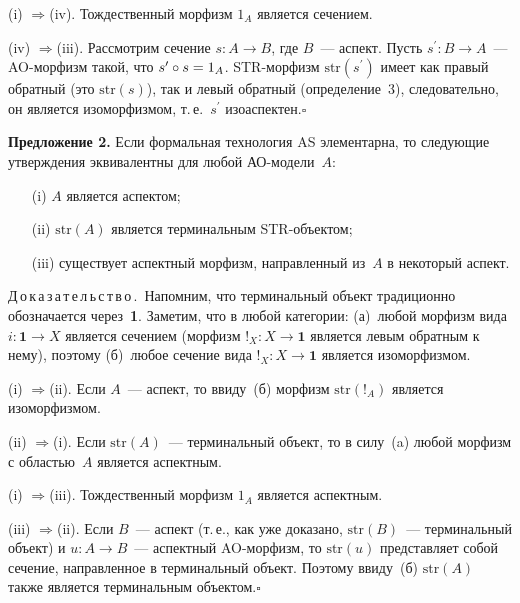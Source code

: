 \begin{multicols}{2}
(i) \;$\Rightarrow$\;(iv). Тождественный морфизм $1_A$ является сечением.

   (iv) \;$\Rightarrow$\;(iii). Рассмотрим сечение $s : A\rightarrow B$, где $B$~--- 
аспект. Пусть $s^\prime  : B \rightarrow A$~--- AO-мор\-физм такой, что 
$s^\prime \circ s \hm= 1_A$. STR-мор\-физм $\mathrm{str}(s^\prime)$ имеет как правый 
обратный (это $\mathrm{str}(s)$), так и левый обратный (определение~3), следовательно, он 
является изоморфизмом, т.\,е.\ $s^\prime$ изоаспектен.\hfill$\square$
  
  \medskip
  
  \noindent
  \textbf{Предложение 2.} Если формальная технология AS элементарна, то 
следующие утверждения эквивалентны для любой АО-мо\-де\-ли~$A$:
   \begin{itemize}
   \item[(i)] $A$ является аспектом;
   \item[(ii)] $\mathrm{str}(A)$ является терминальным STR-объ\-ек\-том;
   \item[(iii)] существует аспектный морфизм, направленный из~$A$ в 
некоторый аспект.
   \end{itemize}
   
   \medskip
   
   \noindent
  Д\,о\,к\,а\,з\,а\,т\,е\,л\,ь\,с\,т\,в\,о\,.\ Напомним, что терминальный объект 
традиционно обозначается через~\textbf{1}. Заметим, что в любой категории: 
(а)~любой морфизм вида $i : \mathbf{1}\rightarrow X$ является сечением 
(морфизм $!_X : X\rightarrow \mathbf{1}$ является левым обратным к нему), 
поэтому (б)~любое сечение вида $!_X : X\rightarrow \mathbf{1}$ является 
изоморфизмом.
   
   (i) \;$\Rightarrow$\;(ii). Если $A$~--- аспект, то ввиду~(б) морфизм $\mathrm{str}(!_A)$ 
является изоморфизмом.
   
   (ii) \;$\Rightarrow$\;(i). Если $\mathrm{str}(A)$~--- терминальный объект, то в силу~(a) 
любой морфизм с областью~$A$ является аспектным.
   
   (i) \;$\Rightarrow$\;(iii). Тождественный морфизм $1_A$ является аспектным.
   
   (iii) \;$\Rightarrow$\;(ii). Если $B$~--- аспект (т.\,е., как уже доказано, 
$\mathrm{str}(B)$~--- терминальный объект) и $u : A \rightarrow B$~--- аспектный 
   AO-мор\-физм, то $\mathrm{str}(u)$ представляет собой сечение, направленное в 
терминальный объект. Поэтому ввиду~(б) $\mathrm{str}(A)$ также является терминальным 
объектом.\hfill$\square$


\end{multicols}
